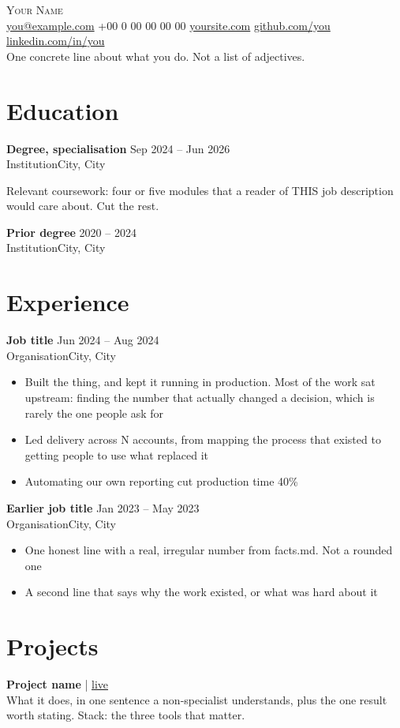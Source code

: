 \documentclass[a4paper,10pt]{article}
\makeatletter
\newcommand{\role}[4]{%
  \vspace{3pt}\textbf{#1} \hfill \textcolor{mid}{#4}\\[1pt]
  \textcolor{mid}{#2\ifx\relax#3\relax\else, #3\fi}\vspace{1pt}\par}
\newcommand{\FullName}{Your Name}
\newcommand{\Tagline}{One concrete line about what you do. Not a list of adjectives.}
\newcommand{\Email}{you@example.com}
\newcommand{\Phone}{+00 0 00 00 00 00}
\newcommand{\Site}{yoursite.com}
\newcommand{\SiteURL}{https://yoursite.com}
\newcommand{\GitHub}{github.com/you}
\newcommand{\GitHubURL}{https://github.com/you}
\newcommand{\LinkedIn}{linkedin.com/in/you}
\newcommand{\LinkedInURL}{https://linkedin.com/in/you}
\makeatother
\begin{document}
{\Huge\scshape \FullName}\\[3pt]
{\color{mid}\small
  \href{mailto:\Email}{\Email} \textbar{}
  \Phone{} \textbar{}
  \href{\SiteURL}{\Site} \textbar{}
  \href{\GitHubURL}{\GitHub} \textbar{}
  \href{\LinkedInURL}{\LinkedIn}}\\[5pt]
{\small \Tagline}

\section{Education}
\role{Degree, specialisation}{Institution}{City}{Sep 2024 -- Jun 2026}
Relevant coursework: four or five modules that a reader of THIS job description would care
about. Cut the rest.

\role{Prior degree}{Institution}{City}{2020 -- 2024}

\section{Experience}
\role{Job title}{Organisation}{City}{Jun 2024 -- Aug 2024}
\begin{itemize}
  \item Built the thing, and kept it running in production. Most of the work sat upstream:
        finding the number that actually changed a decision, which is rarely the one people
        ask for
  \item Led delivery across N accounts, from mapping the process that existed to getting
        people to use what replaced it
  \item Automating our own reporting cut production time 40\%
\end{itemize}

\role{Earlier job title}{Organisation}{City}{Jan 2023 -- May 2023}
\begin{itemize}
  \item One honest line with a real, irregular number from facts.md. Not a rounded one
  \item A second line that says why the work existed, or what was hard about it
\end{itemize}

\section{Projects}
\textbf{Project name} \textcolor{mid}{| \href{https://example.com}{live}} \\
What it does, in one sentence a non-specialist understands, plus the one result worth stating.
Stack: the three tools that matter.
\end{document}
